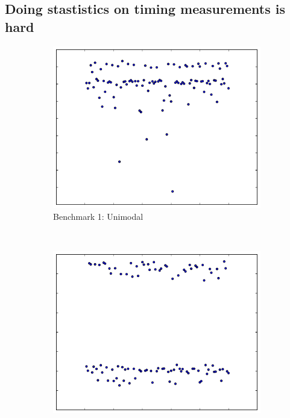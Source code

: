 \documentclass[conference]{IEEEtran}
\begin{document}
\subsection{Doing stastistics on timing measurements is hard}
\begin{figure}
\centering
\begin{subfigure}{0.22\textwidth}
    \centering
    \includegraphics[width=\textwidth]{figures/fig1/simple_branchsum_fast}
    \caption{Benchmark 1: Unimodal}
\end{subfigure}%
~
\begin{subfigure}{0.22\textwidth}
    \centering
    \includegraphics[width=\textwidth]{figures/fig1/bimodal_branchsum}

\end{subfigure}
\end{figure}
\end{document}
